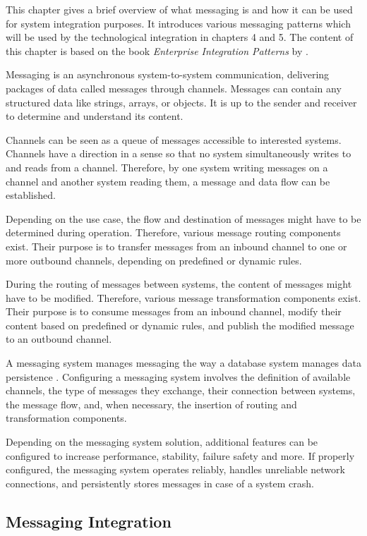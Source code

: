 This chapter gives a brief overview of what messaging is and how it can be used for system integration purposes. It introduces various messaging patterns which will be used by the technological integration in chapters 4 and 5.
The content of this chapter is based on the book \textit{Enterprise Integration Patterns} by \textcite{EIP}.

Messaging is an asynchronous system-to-system communication, delivering packages of data called messages through channels. Messages can contain any structured data like strings, arrays, or objects. It is up to the sender and receiver to determine and understand its content.

Channels can be seen as a queue of messages accessible to interested systems. Channels have a direction in a sense so that no system simultaneously writes to and reads from a channel. Therefore, by one system writing messages on a channel and another system reading them, a message and data flow can be established.

Depending on the use case, the flow and destination of messages might have to be determined during operation. Therefore, various message routing components exist. Their purpose is to transfer messages from an inbound channel to one or more outbound channels, depending on predefined or dynamic rules.

During the routing of messages between systems, the content of messages might have to be modified. Therefore, various message transformation components exist. Their purpose is to consume messages from an inbound channel, modify their content based on predefined or dynamic rules, and publish the modified message to an outbound channel.

A messaging system manages messaging the way a database system manages data persistence \cite[p. 31]{EIP}. Configuring a messaging system involves the definition of available channels, the type of messages they exchange, their connection between systems, the message flow, and, when necessary, the insertion of routing and transformation components.

Depending on the messaging system solution, additional features can be configured to increase performance, stability, failure safety and more. If properly configured, the messaging system operates reliably, handles unreliable network connections, and persistently stores messages in case of a system crash.

\subsection{Messaging Integration}

